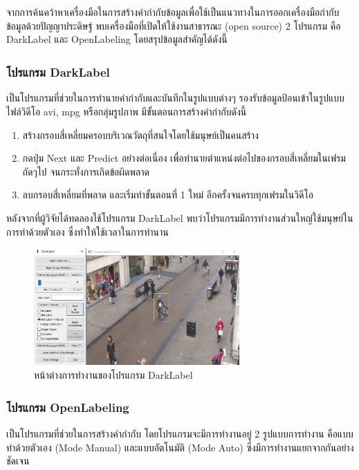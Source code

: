 จากการค้นคว้าหาเครื่องมือในการสร้างคำกำกับข้อมูลเพื่อใช้เป็นแนวทางในการออกเครื่องมือกำกับข้อมูลด้วยปัญญาประดิษฐ์ พบเครื่องมือที่เปิดให้ใช้งานสาธารณะ (open source) 2 โปรแกรม 
คือ DarkLabel และ OpenLabeling โดยสรุปข้อมูลสำคัญได้ดังนี้ 
\subsubsection*{โปรแกรม DarkLabel\textsuperscript{\cite{dark}}}
เป็นโปรแกรมที่ช่วยในการทำนายคำกำกับและบันทึกในรูปแบบต่างๆ รองรับข้อมูลป้อนเข้าในรูปแบบไฟล์วิดีโอ avi, mpg หรือกลุ่มรูปภาพ มีขั้นตอนการสร้างคำกำกับดังนี้ 
\begin{enumerate}
	\setlength\itemsep{-0.25em}
	\item สร้างกรอบสี่เหลี่ยมครอบบริเวณวัตถุที่สนใจโดยใช้มนุษย์เป็นคนสร้าง
	\item กดปุ่ม Next และ Predict อย่างต่อเนื่อง เพื่อทำนายตำแหน่งต่อไปของกรอบสี่เหลี่ยมในเฟรมถัดๆไป จนกระทั่งการเกิดข้อผิดพลาด
	\item ลบกรอบสี่เหลี่ยมที่พลาด และเริ่มทำขั้นตอนที่ 1 ใหม่ อีกครั้งจนครบทุกเฟรมในวิดีโอ
\end{enumerate}

หลังจากที่ผู้วิจัยได้ทดลองใช้โปรแกรม DarkLabel พบว่าโปรแกรมมีการทำงานส่วนใหญ่ใช้มนุษย์ในการทำด้วยตัวเอง ซึ่งทำให้ใช้เวลาในการทำนาน

\begin{figure}[!ht]
	\centering
	\includegraphics[width=0.7\textwidth]{chapter2/images/darklabel.png}
		\caption{หน้าต่างการทำงานของโปรแกรม DarkLabel}
    	\label{fig:darklabel}
\end{figure}
\clearpage

\subsubsection*{โปรแกรม OpenLabeling\textsuperscript{\cite{open}}}
เป็นโปรแกรมที่ช่วยในการสร้างคำกำกับ โดยโปรแกรมจะมีการทำงานอยู่ 2 รูปแบบการทำงาน คือแบบทำด้วยตัวเอง (Mode Manual) และแบบอัตโนมัติ (Mode Auto) 
ซึ่งมีการทำงานแยกจากกันอย่างชัดเจน 

